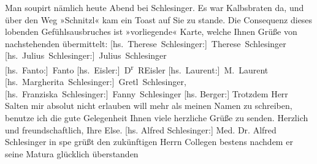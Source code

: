 \begin{ledgroupsized}[t]{13cm}
           \pstart
           Man soupirt nämlich heute{ }Abend bei Schlesinger.
               Es war Kalbsbraten da, und über den Weg »Schnitzl« kam ein Toast auf Sie zu stande.
               Die Consequenz dieses lobenden Gefühlsausbruches ist »vorliegende« Karte, welche
               Ihnen Grüße von nachstehenden \label{K_L03177-1v}\label{K_L03177-1h} übermittelt:\pend
           \pstart
           \spacefill\mbox{{[}hs. Therese Schlesinger:{]} Therese Schlesinger}{ }\spacefill\mbox{{[}hs. Julius Schlesinger:{]} Julius Schlesinger}{\\}\spacefill\mbox{{[}hs. Fanto:{]} Fanto}{ }\spacefill\mbox{{[}hs. Eisler:{]} D\textsuperscript{r} REisler}{ }\spacefill\mbox{{[}hs. Laurent:{]} M. Laurent}{\\}\spacefill\mbox{{[}hs. Margherita Schlesinger:{]} Gretl Schlesinger,}{ }\spacefill\mbox{{[}hs. Franziska Schlesinger:{]} Fanny Schlesinger}\pend
           \pstart
           {[}hs. Berger:{]} Trotzdem Herr Salten mir absolut nicht erlauben \introOben{}will\introOben{} mehr als meinen Namen zu schreiben, benutze ich die gute
               Gelegenheit Ihnen viele herzliche Grüße zu senden. Herzlich und freundschaftlich,
               Ihre \spacefill\mbox{Else.}\pend
           \pstart
           {[}hs. Alfred Schlesinger:{]} Med. Dr. Alfred Schlesinger \introOben{}in
                  spe\introOben{} grüßt den zukünftigen Herrn Collegen bestens nachdem er seine Matura
               glücklich überstanden\pend
           \pstart
           \noindent{}\label{T_L03177-1v}\label{T_L03177-1h}\pend
           
         
         \endnumbering{}\end{ledgroupsized}  \newcommand{\dateiname}{L03177}\newcommand{\titel}{Felix Salten u. a. an Arthur Schnitzler, 6. 8. 1896}\newcommand{\editorInnen}{Martin Anton Müller und Laura Untner}
      
